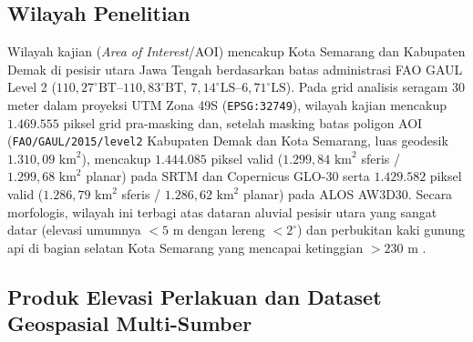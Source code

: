 \documentclass[11pt,twoside]{article}
\begin{document}
\subsection{Wilayah Penelitian}\label{subsec:wilayah}

Wilayah kajian (\textit{Area of Interest}/AOI) mencakup Kota Semarang dan Kabupaten Demak di pesisir utara Jawa Tengah berdasarkan batas administrasi FAO GAUL Level 2 ($110{,}27^\circ\text{BT}\text{--}110{,}83^\circ\text{BT}$, $7{,}14^\circ\text{LS}\text{--}6{,}71^\circ\text{LS}$). Pada grid analisis seragam 30 meter dalam proyeksi UTM Zona 49S (\texttt{EPSG:32749}), wilayah kajian mencakup $1.469.555$ piksel grid pra-masking dan, setelah masking batas poligon AOI (\texttt{FAO/GAUL/2015/level2} Kabupaten Demak dan Kota Semarang, luas geodesik $1.310{,}09\text{ km}^2$), mencakup $1.444.085$ piksel valid ($1.299{,}84\text{ km}^2$ sferis / $1.299{,}68\text{ km}^2$ planar) pada SRTM dan Copernicus GLO-30 serta $1.429.582$ piksel valid ($1.286{,}79\text{ km}^2$ sferis / $1.286{,}62\text{ km}^2$ planar) pada ALOS AW3D30. Secara morfologis, wilayah ini terbagi atas dataran aluvial pesisir utara yang sangat datar (elevasi umumnya $<5\text{ m}$ dengan lereng $<2^\circ$) dan perbukitan kaki gunung api di bagian selatan Kota Semarang yang mencapai ketinggian $>230\text{ m}$ \cite{marfai2008,abidin2015,Husnayaen2018}.

\subsection{Produk Elevasi Perlakuan dan Dataset Geospasial Multi-Sumber}\label{subsec:data}
\end{document}
